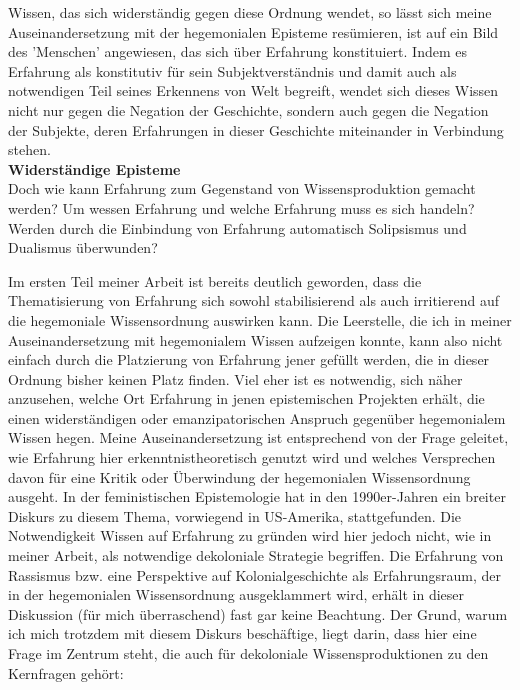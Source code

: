 Wissen, das sich widerständig gegen diese Ordnung wendet, so lässt sich meine
Auseinandersetzung mit der hegemonialen Episteme resümieren, ist auf ein Bild
des 'Menschen' angewiesen, das sich über Erfahrung konstituiert. Indem es
Erfahrung als konstitutiv für sein Subjektverständnis und damit auch als
notwendigen Teil seines Erkennens von Welt begreift, wendet sich dieses Wissen
nicht nur gegen die Negation der Geschichte, sondern auch gegen die Negation der
Subjekte, deren Erfahrungen in dieser Geschichte miteinander in Verbindung
stehen.\\ 

\textbf{\large Widerständige Episteme}\\

Doch wie kann Erfahrung zum Gegenstand von Wissensproduktion gemacht werden? Um
wessen Erfahrung und welche Erfahrung muss es sich handeln? Werden durch die
Einbindung von Erfahrung automatisch Solipsismus und Dualismus überwunden?

Im
ersten Teil meiner Arbeit ist bereits deutlich geworden, dass die Thematisierung
von Erfahrung sich sowohl stabilisierend als auch irritierend auf die
hegemoniale Wissensordnung auswirken kann. Die Leerstelle, die ich in meiner
Auseinandersetzung mit hegemonialem Wissen aufzeigen konnte, kann also nicht
einfach durch die Platzierung von Erfahrung jener gefüllt werden, die in dieser
Ordnung bisher keinen Platz finden. Viel eher ist es notwendig, sich näher
anzusehen, welche Ort Erfahrung in jenen epistemischen Projekten erhält, die
einen widerständigen oder emanzipatorischen Anspruch gegenüber hegemonialem
Wissen hegen. Meine Auseinandersetzung ist entsprechend von der Frage geleitet,
wie Erfahrung hier erkenntnistheoretisch genutzt wird und welches Versprechen
davon für eine Kritik oder Überwindung der hegemonialen Wissensordnung ausgeht.
In der feministischen Epistemologie hat in den 1990er-Jahren ein breiter Diskurs
zu diesem Thema, vorwiegend in US-Amerika, stattgefunden. Die Notwendigkeit
Wissen auf Erfahrung zu gründen wird hier jedoch nicht, wie in meiner Arbeit,
als notwendige dekoloniale Strategie begriffen. Die Erfahrung von Rassismus bzw.
eine Perspektive auf Kolonialgeschichte als Erfahrungsraum, der in der
hegemonialen Wissensordnung ausgeklammert wird, erhält in dieser Diskussion (für
mich überraschend) fast gar keine Beachtung. Der Grund, warum ich mich trotzdem
mit diesem Diskurs beschäftige, liegt darin, dass hier eine Frage im Zentrum
steht, die auch für dekoloniale Wissensproduktionen zu den Kernfragen gehört:

